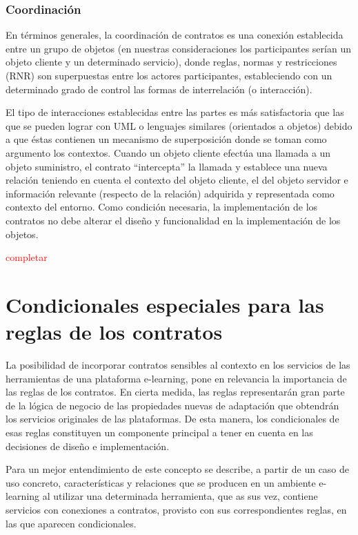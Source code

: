 \begin{itemize}
\subsubsection {Coordinación}

En términos generales, la coordinación de contratos es una conexión establecida
entre un grupo de objetos (en nuestras consideraciones los participantes
serían un objeto cliente y un determinado servicio), donde reglas, normas y
restricciones (RNR) son superpuestas entre los actores participantes, estableciendo
con un determinado grado de control las formas de interrelación (o
interacción).

El tipo de interacciones establecidas entre las partes es más satisfactoria
que las que se pueden lograr con UML o lenguajes similares (orientados a objetos)
debido a que éstas contienen un mecanismo de superposición donde se
toman como argumento los contextos. Cuando un objeto cliente efectúa una
llamada a un objeto suministro, el contrato “intercepta” la llamada y establece
una nueva relación teniendo en cuenta el contexto del objeto cliente, el
del objeto servidor e información relevante (respecto de la relación) adquirida
y representada como contexto del entorno. Como condición necesaria, la
implementación de los contratos no debe alterar el diseño y funcionalidad en
la implementación de los objetos.


\textcolor{red}{completar}



\section{Condicionales especiales para las reglas de los contratos}


La posibilidad de incorporar contratos sensibles al contexto en los servicios de las herramientas de una plataforma e-learning, pone en relevancia la importancia de las reglas de los contratos. En cierta medida, las reglas representarán gran parte de la lógica de negocio de las propiedades nuevas de adaptación que obtendrán los servicios originales de las plataformas. De esta manera, los condicionales de esas reglas constituyen un componente principal a tener en cuenta en las decisiones de diseño e implementación.

Para un mejor entendimiento de este concepto se describe, a partir de un caso de uso concreto, características y relaciones que se producen en un ambiente e-learning al utilizar una determinada herramienta, que as sus vez, contiene servicios con conexiones a contratos, provisto con sus correspondientes reglas, en las que aparecen condicionales.  



\end{itemize}
